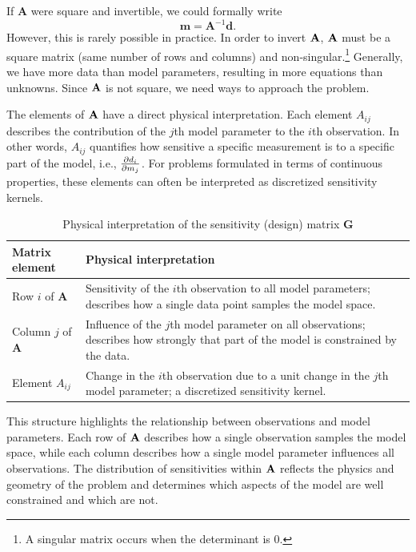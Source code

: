 If $\mathbf{A}$ were square and invertible, we could formally write
\[
\mathbf{m} = \mathbf{A}^{-1} \mathbf{d}.
\]
However, this is rarely possible in practice.  In order to invert $\vb{A}$, $\vb{A}$ must be a square matrix (same number of rows and columns) and non-singular.\footnote{A singular matrix occurs when the determinant is 0.} Generally, we have more data than model parameters, resulting in more equations than unknowns.  Since $\vb{A}$ is not square, we need ways to approach the problem.

The elements of $\vb{A}$ have a direct physical interpretation. Each element $A_{ij}$ describes the contribution of the $j$th model parameter to the $i$th observation. In other words, $A_{ij}$ quantifies how sensitive a specific measurement is to a specific part of the model, i.e., $\pdv{d_i}{m_j}$. For problems formulated in terms of continuous properties, these elements can often be interpreted as discretized sensitivity kernels.
\begin{table}[h]
    \centering
    \caption{Physical interpretation of the sensitivity (design) matrix $\mathbf{G}$}
    \begin{tabularx}{\textwidth}{@{}lX@{}}
        \toprule
        \textbf{Matrix element} & \textbf{Physical interpretation} \\
        \midrule
        Row $i$ of $\mathbf{A}$ &
        Sensitivity of the $i$th observation to all model parameters; describes how a single data point samples the model space. \\[0.5em]

        Column $j$ of $\mathbf{A}$ &
        Influence of the $j$th model parameter on all observations; describes how strongly that part of the model is constrained by the data. \\[0.5em]

        Element $A_{ij}$ &
        Change in the $i$th observation due to a unit change in the $j$th model parameter; a discretized sensitivity kernel. \\
        \bottomrule
    \end{tabularx}
\end{table}

This structure highlights the relationship between observations and model parameters. Each row of $\vb{A}$ describes how a single observation samples the model space, while each column describes how a single model parameter influences all observations. The distribution of sensitivities within $\vb{A}$ reflects the physics and geometry of the problem and determines which aspects of the model are well constrained and which are not.

